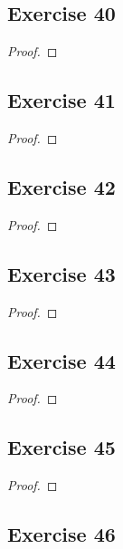 \documentclass[14pt]{extarticle}
\begin{document}
\subsection{Exercise 40}

\begin{proof}

\end{proof}

\subsection{Exercise 41}

\begin{proof}

\end{proof}

\subsection{Exercise 42}

\begin{proof}

\end{proof}

\subsection{Exercise 43}

\begin{proof}

\end{proof}

\subsection{Exercise 44}

\begin{proof}

\end{proof}

\subsection{Exercise 45}

\begin{proof}

\end{proof}

\subsection{Exercise 46}
\end{document}
